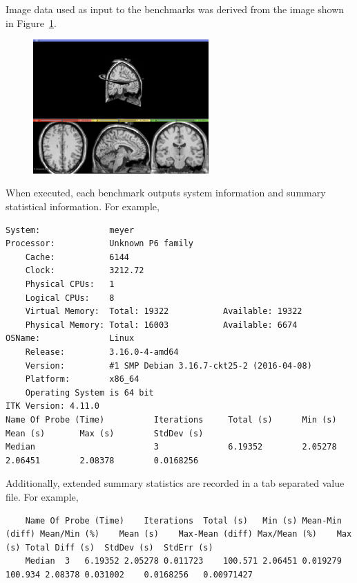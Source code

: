 \documentclass{InsightArticle}
\begin{document}
Image data used as input to the benchmarks was derived from the image shown in
Figure~\ref{fig:InputBrainWeb}.

\begin{figure}
\center
\includegraphics[width=0.6\textwidth]{InputBrainWeb}
\label{fig:InputBrainWeb}
\end{figure}

When executed, each benchmark outputs system information and summary
statistical information. For example,

\scriptsize
\begin{verbatim}
System:              meyer
Processor:           Unknown P6 family
    Cache:           6144
    Clock:           3212.72
    Physical CPUs:   1
    Logical CPUs:    8
    Virtual Memory:  Total: 19322           Available: 19322
    Physical Memory: Total: 16003           Available: 6674
OSName:              Linux
    Release:         3.16.0-4-amd64
    Version:         #1 SMP Debian 3.16.7-ckt25-2 (2016-04-08)
    Platform:        x86_64
    Operating System is 64 bit
ITK Version: 4.11.0
Name Of Probe (Time)          Iterations     Total (s)      Min (s)        Mean (s)       Max (s)        StdDev (s)
Median                        3              6.19352        2.05278        2.06451        2.08378        0.0168256
\end{verbatim}
\normalsize

Additionally, extended summary statistics are recorded in a tab separated
value file. For example,

\tiny
\begin{verbatim}
	Name Of Probe (Time)	Iterations	Total (s)	Min (s)	Mean-Min (diff)	Mean/Min (%)	Mean (s)	Max-Mean (diff)	Max/Mean (%)	Max (s)	Total Diff (s)	StdDev (s)	StdErr (s)
	Median	3	6.19352	2.05278	0.011723	100.571	2.06451	0.019279	100.934	2.08378	0.031002	0.0168256	0.00971427
\end{verbatim}
\normalsize
\end{document}
